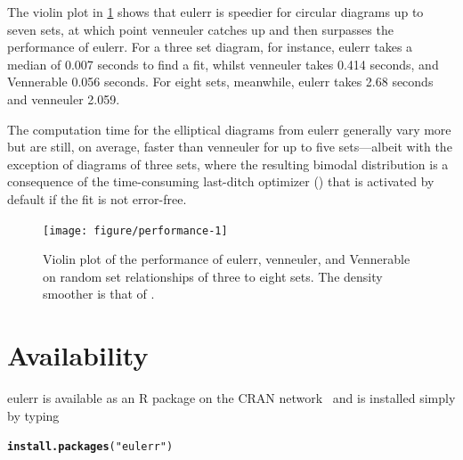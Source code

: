 \documentclass[
  oneside,
  openany,
  numbers=noendperiod,
  parskip=half,
  bibliography=totoc
]{scrbook}\usepackage[]{graphicx}\usepackage{xcolor}
\makeatletter
\newcommand{\hlstr}[1]{\textcolor[rgb]{0.192,0.494,0.8}{#1}}%
\newcommand{\hlstd}[1]{\textcolor[rgb]{0.345,0.345,0.345}{#1}}%
\newcommand{\hlkwd}[1]{\textcolor[rgb]{0.737,0.353,0.396}{\textbf{#1}}}%
\newenvironment{kframe}{%
 \def\at@end@of@kframe{}%
 \ifinner\ifhmode%
  \def\at@end@of@kframe{\end{minipage}}%
  \begin{minipage}{\columnwidth}%
 \fi\fi%
 \def\FrameCommand##1{\hskip\@totalleftmargin \hskip-\fboxsep
 \colorbox{shadecolor}{##1}\hskip-\fboxsep
     \hskip-\linewidth \hskip-\@totalleftmargin \hskip\columnwidth}%
 \MakeFramed {\advance\hsize-\width
   \@totalleftmargin\z@ \linewidth\hsize
   \@setminipage}}%
 {\par\unskip\endMakeFramed%
 \at@end@of@kframe}
\newenvironment{knitrout}{}{} %
\newcommand{\pkg}[1]{{\fontseries{b}\selectfont #1}}
\makeatother
\begin{document}
The violin plot in \cref{fig:performance} shows that \pkg{eulerr} is speedier
for circular diagrams up to seven sets, at which point \pkg{venneuler} catches
up and then surpasses the performance of \pkg{eulerr}. For a three set diagram,
for instance, \pkg{eulerr} takes a median of
0.007
seconds to find a fit, whilst \pkg{venneuler} takes 0.414
seconds, and \pkg{Vennerable} 0.056
seconds. For eight sets, meanwhile, \pkg{eulerr} takes
2.68
seconds and \pkg{venneuler} 2.059.

The computation time for the elliptical
diagrams from \pkg{eulerr} generally vary more but are still, on average,
faster than \pkg{venneuler} for up to five sets---albeit with the exception
of diagrams of three sets, where the resulting bimodal distribution is a
consequence of the time-consuming
last-ditch optimizer () that is activated by default
if the fit is not error-free.

\begin{figure}[hbtp]
\begin{knitrout}\small
{}\color{fgcolor}

{\centering \texttt{[image: figure/performance-1]}

}



\end{knitrout}
\caption{Violin plot of the performance of \pkg{eulerr}, \pkg{venneuler}, and \pkg{Vennerable} on
random set relationships of three to eight sets. The density smoother is that of \citet{Sheather_1991}.}
\label{fig:performance}
\end{figure}

\section{Availability}\label{sec:availability}

\pkg{eulerr} is available as an R package on the CRAN network~\citep{RCT_2017a}
and is installed simply by typing

\begin{knitrout}\small
{}\color{fgcolor}\begin{kframe}
\begin{alltt}
\hlkwd{install.packages}\hlstd{(}\hlstr{"eulerr"}\hlstd{)}
\end{alltt}
\end{kframe}
\end{knitrout}
\end{document}

